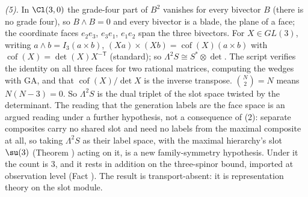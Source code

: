 \emph{(5).} In $\Cl(3,0)$ the grade-four part of $B^{2}$ vanishes for every bivector $B$ (there is no grade four), so $B \wedge B = 0$ and every bivector is a blade, the plane of a face; the coordinate faces $e_{2}e_{3}$, $e_{3}e_{1}$, $e_{1}e_{2}$ span the three bivectors. For $X \in GL(3)$, writing $a \wedge b = I_{3}(a \times b)$, $(Xa) \times (Xb) = \operatorname{cof}(X)(a \times b)$ with $\operatorname{cof}(X) = \det(X)X^{-\mathsf T}$ (standard); so $\Lambda^{2}S \cong S^{*} \otimes \det$. The script verifies the identity on all three faces for two rational matrices, computing the wedges with GA, and that $\operatorname{cof}(X)/\det X$ is the inverse transpose. $\binom{N}{2} = N$ means $N(N - 3) = 0$. So $\Lambda^{2}S$ is the dual triplet of the slot space twisted by the determinant. The reading that the generation labels are the face space is an argued reading under a further hypothesis, not a consequence of (2): separate composites carry no shared slot and need no labels from the maximal composite at all, so taking $\Lambda^{2}S$ as their label space, with the maximal hierarchy's slot $\su(3)$ (Theorem ) acting on it, is a new family-symmetry hypothesis. Under it the count is $3$, and it rests in addition on the three-spinor bound, imported at observation level (Fact ). The result is transport-absent: it is representation theory on the slot module.
